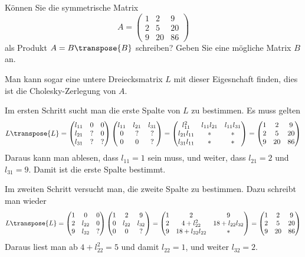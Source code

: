 Können Sie die symmetrische Matrix
\[
A=\begin{pmatrix}
1& 2& 9\\
2& 5&20\\
9&20&86
\end{pmatrix}
\]
als Produkt $A=B\transpose{B}$ schreiben? Geben Sie eine mögliche Matrix $B$ an.


\begin{loesung}
Man kann sogar eine untere Dreiecksmatrix $L$ mit dieser Eigesnchaft finden,
dies ist die Cholesky-Zerlegung von $A$.

Im ersten Schritt sucht man die erste Spalte von $L$ zu bestimmen.
Es muss gelten
\[
L\transpose{L}=
\begin{pmatrix}
l_{11}&  0&  0\\
l_{21}&  ?&  0\\
l_{31}&  ?&  ?
\end{pmatrix}
\begin{pmatrix}
l_{11}&l_{21}&l_{31}\\
     0&     ?&     ?\\
     0&     0&     ?
\end{pmatrix}
=
\begin{pmatrix}
    l_{11}^2&l_{11}l_{21}&l_{11}l_{31}\\
l_{21}l_{11}&           *&           *\\
l_{31}l_{11}&           *&           *
\end{pmatrix}
=
\begin{pmatrix}
1& 2& 9\\
2& 5&20\\
9&20&86
\end{pmatrix}
\]
Daraus kann man ablesen, dass $l_{11}=1$ sein muss, und weiter,
dass
$l_{21}=2$ und $l_{31}=9$. Damit ist die erste Spalte bestimmt.

Im zweiten Schritt versucht man, die zweite Spalte zu bestimmen.
Dazu schreibt man wieder
\[
L\transpose{L}
=
\begin{pmatrix}
1&     0&0\\
2&l_{22}&0\\
9&l_{32}&?
\end{pmatrix}
\begin{pmatrix}
1&     2&     9\\
0&l_{22}&l_{32}\\
0&     0&?
\end{pmatrix}
=
\begin{pmatrix}
1&2           &           9\\
2&4+l_{22}^2  &18+l_{22}l_{32}\\
9&18+l_{32}l_{22}&         *
\end{pmatrix}
=
\begin{pmatrix}
1& 2& 9\\
2& 5&20\\
9&20&86
\end{pmatrix}
\]
Daraus liest man ab $4+l_{22}^2=5$ und damit $l_{22}=1$, und weiter
$l_{32}=2$.


\end{loesung}
